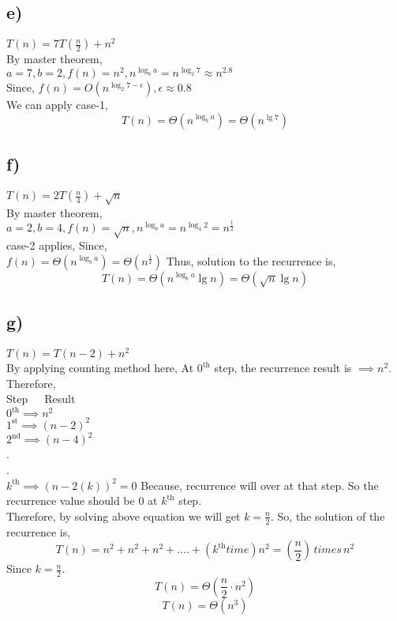 \documentclass[a4paper, 11pt]{article}
\begin{document}
\subsection*{e)}
$T(n) =7 T(\frac{n}{2}) + n^2$\\
By master theorem,\\
$a=7, b=2, f(n) = n^2, n^{\log_{b}a}=n^{\log_{2}7} \approx n^{2.8}$\\
Since, $f(n)=O(n^{\log_{2}7 - \epsilon}), \epsilon \approx 0.8$\\
We can apply case-1,
$$T(n) = \Theta (n^{\log_{b}a}) = \Theta(n^{\lg 7})$$

\subsection*{f)}
$T(n) =2 T(\frac{n}{4}) + \sqrt{n}$\\
By master theorem,\\
$a=2, b=4, f(n) = \sqrt{n}, n^{\log_{b}a}=n^{\log_{4}2} = n^{\frac{1}{2}}$\\
case-2 applies, Since,\\
$f(n)= \Theta(n^{\log_{b}a}) = \Theta(n^\frac{1}{2})$
Thus, solution to the recurrence is,
$$T(n) = \Theta (n^{\log_{b}a} \lg n) = \Theta (\sqrt{n} \lg n)$$

\subsection*{g)}
$T(n)= T(n-2)+n^2$\\
By applying counting method here,
At $0^{\text{th}}$ step, the recurrence result is $\implies n^2$.\\
Therefore,\\
Step \,\,\,\,\, Result\\
$0^{\text{th}} \implies n^2$\\
$1^{\text{st}} \implies (n-2)^2$\\
$2^{\text{nd}} \implies (n-4)^2$\\
.\\
.\\  
$k^{\text{th}} \implies (n-2(k))^2 =0 $ Because, recurrence will over at that step. So the recurrence value should be 0 at $k^{\text{th}}$ step. \\
Therefore, by solving above equation we will get $k=\frac{n}{2}$.
So, the solution of the recurrence is,
$$T(n) = n^2 + n^2 + n^2 +....+(k^{\text{th}} time)n^2 = (\frac{n}{2})\, times\, n^2$$ Since $k=\frac{n}{2}$.
$$T(n) = \Theta(\frac{n}{2}\cdot n^2)$$
$$T(n) = \Theta(n^3)$$
\end{document}
